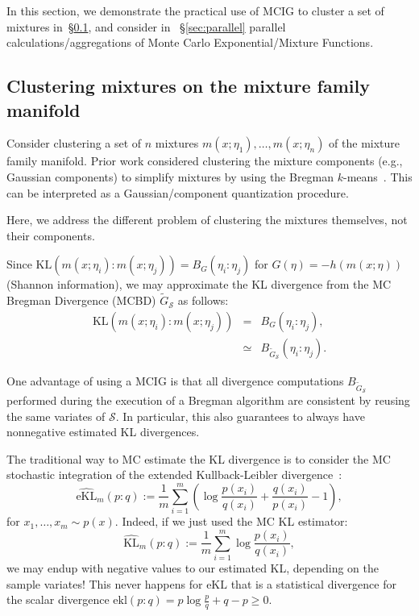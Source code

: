 \documentclass[graybox]{svmult}
\def\KL{\mathrm{KL}}
\def\ekl{\mathrm{ekl}}
\def\eqdef{:=}
\def\tildeG{\tilde{G}}
\def\calS{\mathcal{S}}
\def\eKL{\mathrm{eKL}}
\begin{document}
In this section, we demonstrate the practical use of MCIG to cluster a set of mixtures in~\S\ref{sec:clustmix}, and consider in ~\S\ref{sec:parallel} parallel calculations/aggregations of Monte Carlo Exponential/Mixture Functions.

\subsection{Clustering mixtures on the mixture family manifold}\label{sec:clustmix}
Consider clustering a set of $n$ mixtures $m(x;\eta_1),\ldots, m(x;\eta_n)$ of the mixture family manifold.
Prior work considered clustering the mixture components (e.g., Gaussian components) to simplify mixtures by using the Bregman $k$-means~\cite{GaussianClustering-2007,GaussianClustering-2009}. This can be interpreted as a Gaussian/component quantization procedure.

Here, we address the different problem of clustering the mixtures themselves, not their components.

Since $\KL(m(x;\eta_i):m(x;\eta_j))=B_G(\eta_i:\eta_j)$ for $G(\eta)=-h(m(x;\eta))$ (Shannon information), we may approximate the KL divergence from the MC Bregman Divergence (MCBD) $\tildeG_\calS$ as follows:
\begin{eqnarray}
\KL(m(x;\eta_i):m(x;\eta_j))&=& B_G(\eta_i:\eta_j),\\
&\simeq&  B_{\tildeG_\calS}(\eta_i:\eta_j). %
\end{eqnarray}

One advantage of using a MCIG is that all divergence computations $B_{\tildeG_\calS}$ performed during the execution of a Bregman algorithm are consistent by reusing the same variates of $\calS$.
In particular, this also guarantees to always have nonnegative estimated KL divergences.

The traditional way to MC estimate the KL divergence is to consider the MC stochastic integration of the extended Kullback-Leibler divergence~\cite{Bregman-2005}:
\begin{equation}
\widehat{\eKL}_m(p:q) \eqdef \frac{1}{m} \sum_{i=1}^m \left(  \log \frac{p(x_i)}{q(x_i)}  + \frac{q(x_i)}{p(x_i)} -  1 \right),
\end{equation}
for $x_1,\ldots,x_m \sim p(x)$.
Indeed, if we just used the MC KL estimator:
\begin{equation}
\widehat{\KL}_m(p:q) \eqdef \frac{1}{m} \sum_{i=1}^m    \log \frac{p(x_i)}{q(x_i)},
\end{equation}
we may endup with negative values to our estimated KL, depending on the sample variates!
This never happens for $\eKL$ that is a statistical divergence for the scalar divergence $\ekl(p:q)=p\log \frac{p}{q}+q-p\geq 0$.
\end{document}
